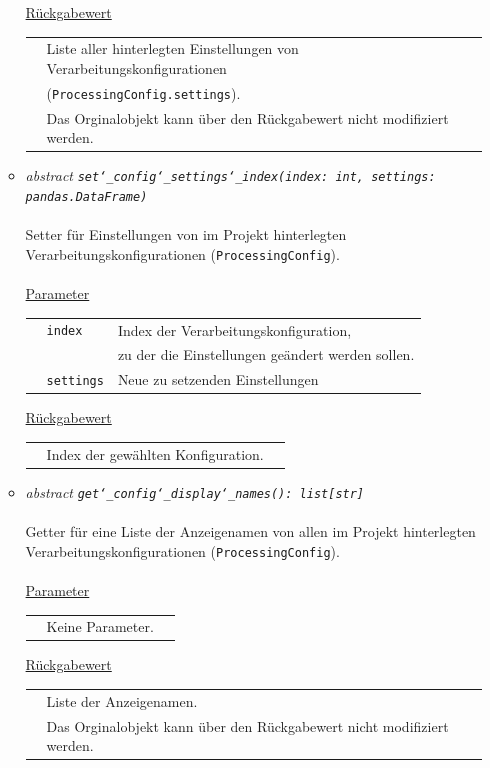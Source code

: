 \documentclass{article}
\begin{document}
\begin{itemize}
\begin{itemize}
\underline{Rückgabewert}\\
\begin{tabular}{lll}
 & Liste aller hinterlegten Einstellungen von Verarbeitungskonfigurationen\\
 & (\texttt{ProcessingConfig.settings}).\\
 & Das Orginalobjekt kann über den Rückgabewert nicht modifiziert werden.\\
\end{tabular}


\item \textit{\flqq{}abstract\frqq} \texttt{\textit{set\char`_config\char`_settings\char`_index(index: int, settings: pandas.DataFrame)}}\\\\
Setter für Einstellungen von im Projekt hinterlegten Verarbeitungskonfigurationen (\texttt{ProcessingConfig}).
\\\\
\underline{Parameter}\\
\begin{tabular}{lll}
 & \texttt{index} & Index der Verarbeitungskonfiguration,\\
 && zu der die Einstellungen geändert werden sollen.\\
 & \texttt{settings} & Neue zu setzenden Einstellungen\\
\end{tabular}

\underline{Rückgabewert}\\
\begin{tabular}{lll}
 & Index der gewählten Konfiguration.\\
\end{tabular}


\item \textit{\flqq{}abstract\frqq} \texttt{\textit{get\char`_config\char`_display\char`_names(): list[str]}}\\\\
Getter für eine Liste der Anzeigenamen von allen im Projekt hinterlegten Verarbeitungskonfigurationen (\texttt{ProcessingConfig}).
\\\\
\underline{Parameter}\\
\begin{tabular}{lll}
 & Keine Parameter.
\end{tabular}

\underline{Rückgabewert}\\
\begin{tabular}{lll}
 & Liste der Anzeigenamen.\\
 & Das Orginalobjekt kann über den Rückgabewert nicht modifiziert werden.\\
\end{tabular}



\end{itemize}
\end{itemize}
\end{document}
